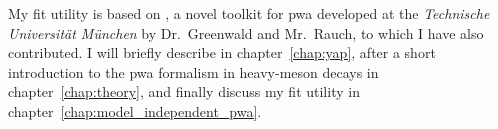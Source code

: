     My fit utility is based on , a novel \cpp{} toolkit for \ac{pwa} developed at the \textsl{Technische Universit\"at M\"unchen} by Dr.~Greenwald and Mr.~Rauch, to which I have also contributed.
    I will briefly describe  in chapter~\ref{chap:yap}, after a short introduction to the \ac{pwa} formalism in heavy-meson decays in chapter~\ref{chap:theory}, and finally discuss my fit utility in chapter~\ref{chap:model_independent_pwa}.


%
%
%
%    
%
%
%
%
%    
%    
%
%
%
%
%
%
%
%
%
%
%
%
%
%
%
%
%
%
%
%
%
%
